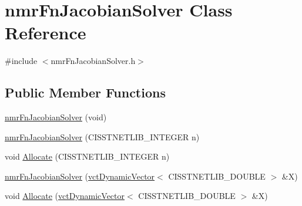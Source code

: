 \hypertarget{classnmr_fn_jacobian_solver}{\section{nmr\-Fn\-Jacobian\-Solver Class Reference}
\label{classnmr_fn_jacobian_solver}
}


{\ttfamily \#include $<$nmr\-Fn\-Jacobian\-Solver.\-h$>$}

\subsection*{Public Member Functions}
\begin{DoxyCompactItemize}
\item 
\hyperlink{classnmr_fn_jacobian_solver_a42945a9762a21086dbed694fb2eae847}{nmr\-Fn\-Jacobian\-Solver} (void)
\item 
\hyperlink{classnmr_fn_jacobian_solver_a093c7f03d142c70a018d1fd197204e9a}{nmr\-Fn\-Jacobian\-Solver} (C\-I\-S\-S\-T\-N\-E\-T\-L\-I\-B\-\_\-\-I\-N\-T\-E\-G\-E\-R n)
\item 
void \hyperlink{classnmr_fn_jacobian_solver_a24d51b6d33d9e14fe233dd3c5346bf97}{Allocate} (C\-I\-S\-S\-T\-N\-E\-T\-L\-I\-B\-\_\-\-I\-N\-T\-E\-G\-E\-R n)
\end{DoxyCompactItemize}
{\bf }\par
\begin{DoxyCompactItemize}
\item 
\hyperlink{classnmr_fn_jacobian_solver_a4cb9401ac4fde1fbfedd87ca8ab3290a}{nmr\-Fn\-Jacobian\-Solver} (\hyperlink{classvct_dynamic_vector}{vct\-Dynamic\-Vector}$<$ C\-I\-S\-S\-T\-N\-E\-T\-L\-I\-B\-\_\-\-D\-O\-U\-B\-L\-E $>$ \&X)
\end{DoxyCompactItemize}

{\bf }\par
\begin{DoxyCompactItemize}
\item 
void \hyperlink{classnmr_fn_jacobian_solver_a9c3cebdf5c983c51380cae418739cf34}{Allocate} (\hyperlink{classvct_dynamic_vector}{vct\-Dynamic\-Vector}$<$ C\-I\-S\-S\-T\-N\-E\-T\-L\-I\-B\-\_\-\-D\-O\-U\-B\-L\-E $>$ \&X)
\end{DoxyCompactItemize}


